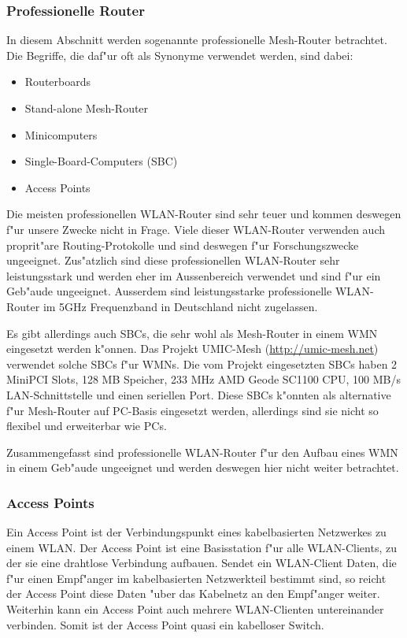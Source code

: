 \clearpage
\subsubsection{Professionelle Router}

In diesem Abschnitt werden sogenannte professionelle Mesh-Router betrachtet. 
Die Begriffe, die daf"ur oft als Synonyme verwendet werden, sind dabei: 

\begin{itemize}	
\item Routerboards
\item Stand-alone Mesh-Router 
\item Minicomputers 
\item Single-Board-Computers (SBC) 
\item Access Points
\end{itemize}

Die meisten professionellen WLAN-Router sind sehr teuer und kommen deswegen
f"ur unsere Zwecke nicht in Frage. Viele dieser WLAN-Router verwenden auch
proprit"are Routing-Protokolle und sind deswegen f"ur Forschungszwecke
ungeeignet. Zus"atzlich sind diese professionellen WLAN-Router sehr
leistungsstark und werden eher im Aussenbereich verwendet und
sind f"ur ein Geb"aude ungeeignet. Ausserdem sind leistungsstarke
professionelle WLAN-Router im 5GHz Frequenzband in Deutschland
nicht zugelassen.

Es gibt allerdings auch SBCs, die sehr wohl als Mesh-Router in einem WMN
eingesetzt werden k"onnen. Das Projekt UMIC-Mesh (\url{http://umic-mesh.net})
verwendet solche SBCs f"ur WMNs. Die vom Projekt eingesetzten SBCs
haben 2 MiniPCI Slots, 128 MB Speicher, 233 MHz AMD Geode SC1100 CPU,
100 MB/s LAN-Schnittstelle und einen seriellen Port. Diese SBCs k"onnten
als alternative f"ur Mesh-Router auf PC-Basis eingesetzt werden, allerdings
sind sie nicht so flexibel und erweiterbar wie PCs.

Zusammengefasst sind professionelle WLAN-Router f"ur den Aufbau eines
WMN in einem Geb"aude ungeeignet und werden deswegen hier nicht weiter betrachtet.

\subsubsection{Access Points}

Ein Access Point ist der Verbindungspunkt eines kabelbasierten
Netzwerkes zu einem WLAN. Der Access Point ist eine Basisstation f"ur alle
WLAN-Clients, zu der sie eine drahtlose Verbindung aufbauen.
Sendet ein WLAN-Client Daten, die f"ur einen Empf"anger im kabelbasierten
Netzwerkteil bestimmt sind, so reicht der Access Point diese Daten "uber
das Kabelnetz an den Empf"anger weiter. Weiterhin kann ein Access Point
auch mehrere WLAN-Clienten untereinander verbinden. Somit ist der Access Point
quasi ein kabelloser Switch.


